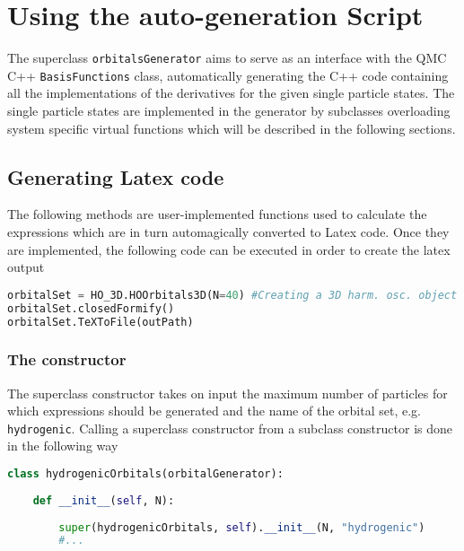 \section{Using the auto-generation Script}

The superclass \verb+orbitalsGenerator+ aims to serve as an interface with the QMC C++ \verb+BasisFunctions+ class, automatically generating the C++ code containing all the implementations of the derivatives for the given single particle states. The single particle states are implemented in the generator by subclasses overloading system specific virtual functions which will be described in the following sections.

\subsection{Generating Latex code}

The following methods are user-implemented functions used to calculate the expressions which are in turn automagically converted to Latex code. Once they are implemented, the following code can be executed in order to create the latex output

\vspace{0.25cm}
\begin{lstlisting}[language=Python]
orbitalSet = HO_3D.HOOrbitals3D(N=40) #Creating a 3D harm. osc. object
orbitalSet.closedFormify() 
orbitalSet.TeXToFile(outPath)
\end{lstlisting}

\subsubsection{The constructor}

The superclass constructor takes on input the maximum number of particles for which expressions should be generated and the name of the orbital set, e.g. \verb+hydrogenic+.
Calling a superclass constructor from a subclass constructor is done in the following way

\vspace{0.25cm}
\begin{lstlisting}[language=Python, otherkeywords={self}]
class hydrogenicOrbitals(orbitalGenerator):
 
    def __init__(self, N):
      
        super(hydrogenicOrbitals, self).__init__(N, "hydrogenic")
        #...
\end{lstlisting}


